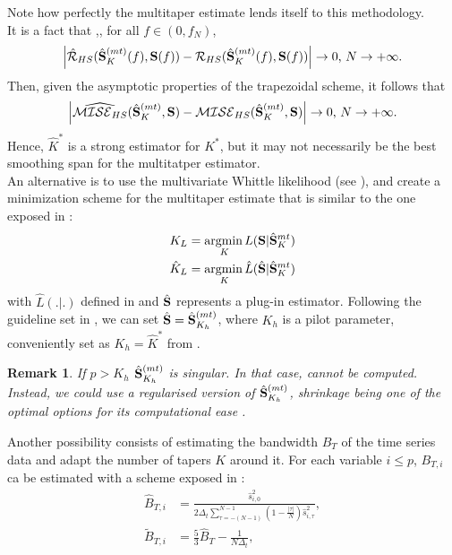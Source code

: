 \documentclass[9pt,journal]{IEEEtran}
\numberwithin{equation}{section}
\newtheorem{remark}{Remark}
\newcommand\argmin{\normalfont \mbox{argmin}\,}
\newcommand\fnyq{f_N}
\begin{document}
 Note how perfectly the multitaper estimate lends itself to this methodology. \\
It is a fact that \cite{Chen2010},\cite{Walden}, for all $f \in (0,\fnyq)$,
\begin{equation*}
\left|\hat{\mathcal{R}}_{HS}(\hat{\bold S}^{(mt)}_K(f),\bold S(f)) - \mathcal{R}_{HS}(\hat{\bold S}^{(mt)}_K(f),\bold S(f))\right| \rightarrow 0 \text{, } N \rightarrow +\infty.
\end{equation*}
Then, given the asymptotic properties of the trapezoidal scheme, it follows that
\begin{equation*}
\left|\widehat{\mathcal{MISE}_{HS}}(\hat{\bold S}^{(mt)}_K,\bold S)  - \mathcal{MISE}_{HS}(\hat{\bold S}^{(mt)}_K,\bold S) \right| \rightarrow 0 \text{, } N \rightarrow +\infty.
\end{equation*}
Hence, $\hat{K}^*$ is a strong estimator for $K^*$, but it may not necessarily be the best smoothing span for the multitatper estimator.
\\
An alternative is to use the multivariate Whittle likelihood \cite{Dahlhaus2000} (see ), and create a minimization scheme for the multitaper estimate that is similar to the one exposed in \cite{Ombao2001}:
\begin{align}
K_L &= \underset{K}{\argmin} L(\bold S | \hat{\bold S}^{mt}_K) \nonumber \\
\hat{K}_L &= \underset{K}{\argmin} \hat{L}(\hat{\bold S} | \hat{\bold S}^{mt}_K) \label{eq:procedure2}
\end{align}
with $\hat{L}(.|.)$ defined in  and $\hat{\bold S}$ represents a plug-in estimator. Following the guideline set in \cite{C.M.Lee2001}, we can set $\hat{\bold S} = \hat{\bold S}^{(mt)}_{K_h}$, where $K_h$ is a pilot parameter, conveniently set as $K_h = \hat{K}^*$ from .
\begin{remark}
If  $p>K_h$ $\hat{\bold S}^{(mt)}_{K_h}$ is singular. In that case,  cannot be computed. Instead, we could use a regularised version of $\hat{\bold S}^{(mt)}_{K_h}$, shrinkage being one of the optimal options for its computational ease \cite{Walden}.
\end{remark}
\setcounter{section}{2}
\setcounter{equation}{7}
Another possibility  consists of estimating the bandwidth $B_T$ of the time series data and adapt the number of tapers $K$ around it. For each variable $i \leq p$, $B_{T,i}$ ca be estimated with a scheme exposed in \cite{Walden1990}:
\begin{align}
\hat{B}_{T,i} &= \frac{\hat{s}^2_{i,0}}{2\Delta_t \sum^{N-1}_{\tau=-(N-1)} (1-\frac{|\tau|}{N})\hat{s}^2_{i,\tau}}, \nonumber\\
\tilde{B}_{T,i} &= \frac{5}{3}\hat{B}_T-\frac{1}{N\Delta_t} \label{eq:debiasedBT},
\end{align}
\end{document}
